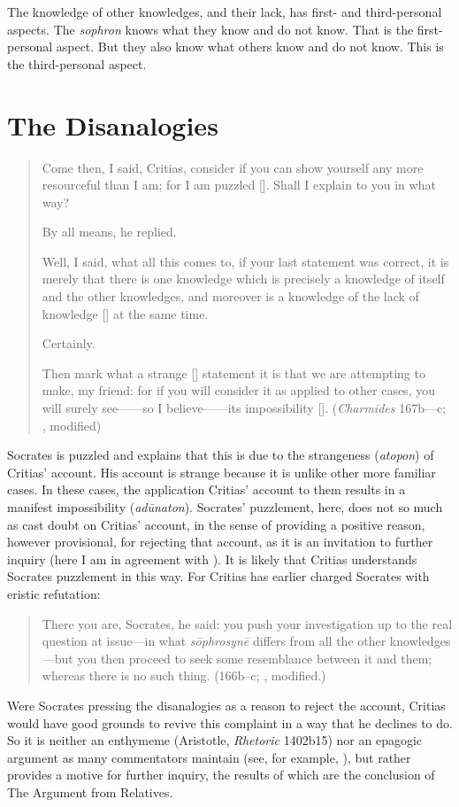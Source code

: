 The knowledge of other knowledges, and their lack, has first- and third-personal aspects. The \emph{sophron} knows what they know and do not know. That is the first-personal aspect. But they also know what others know and do not know. This is the third-personal aspect. 


\section{The Disanalogies} %
\label{sec:the_disanalogies}

\begin{quotation}
	Come then, I said, Critias, consider if you can show yourself any more resourceful than I am; for I am puzzled []. Shall I explain to you in what way?
	
	By all means, he replied.
	
	Well, I said, what all this comes to, if your last statement was correct, it is merely that there is one knowledge which is precisely a knowledge of itself and the other knowledges, and moreover is a knowledge of the lack of knowledge [] at the same time.
	
	Certainly.
	
	Then mark what a strange [] statement it is that we are attempting to make, my friend: for if you will consider it as applied to other cases, you will surely see——so I believe——its impossibility []. (\emph{Charmides} 167b—c; \citealt[57]{Lamb:1927qw}, modified)
\end{quotation}

Socrates is puzzled and explains that this is due to the strangeness (\emph{atopon}) of  Critias' account. His account is strange because it is unlike other more familiar cases. In these cases, the application Critias' account to them results in a manifest impossibility (\emph{adūnaton}). Socrates' puzzlement, here, does not so much as cast doubt on Critias' account, in the sense of providing a positive reason, however provisional, for rejecting that account, as it is an invitation to further inquiry (here I am in agreement with \citealt{Politis:2008nv}). It is likely that Critias understands Socrates puzzlement in this way. For Critias has earlier charged Socrates with eristic refutation:
\begin{quote}
	There you are, Socrates, he said: you push your investigation up to the real question at issue—in what \emph{sōphrosynē} differs from all the other knowledges—but you then proceed to seek some resemblance between it and them; whereas there is no such thing. (166b–c; \citealt[53]{Lamb:1927qw}, modified.)
\end{quote}	
Were Socrates pressing the disanalogies as a reason to reject the account, Critias would have good grounds to revive this complaint in a way that he declines to do. So it is neither an enthymeme (Aristotle, \emph{Rhetoric} 1402b15) nor an epagogic argument as many commentators maintain (see, for example, \citealt[41]{Robinson:1941yb}), but rather provides a motive for further inquiry, the results of which are the conclusion of The Argument from Relatives.

